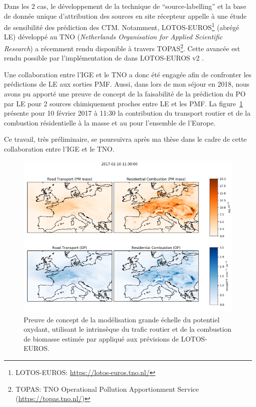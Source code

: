 Dans les 2 cas, le développement de la technique de ``source-labelling'' et la base de
donnée unique d'attribution des sources en site récepteur appelle à une étude de
sensibilité des prédiction des CTM. Notamment, LOTOS-EUROS\footnote{LOTOS-EUROS:
    \url{https://lotos-euros.tno.nl/}} (abrégé LE) développé au TNO (\textit{Netherlands Organisation for
Applied Scientific Research}) a récemment rendu disponible à travers TOPAS\footnote{TOPAS:
TNO Operational Pollution Apportionment Service (\url{https://topas.tno.nl/})}. Cette
avancée est rendu possible par l'implémentation de \cite{kranenburgSource2013} dans
LOTOS-EUROS v2 \autocite{mandersCurriculum2017}.

Une collaboration entre l'IGE et le TNO a donc été engagée afin de confronter les
prédictions de LE aux sorties PMF. Aussi, dans lors de mon séjour en 2018, nous
avons pu apporté une preuve de concept de la faisabilité de la prédiction du PO par
LE pour 2 sources chimiquement proches entre LE et les PMF.
La figure~\ref{fig:OPmap} présente pour 10 février 2017 à 11:30 la contribution du
transport routier et de la combustion résidentielle à la masse et au \PODTTv{} pour
l'ensemble de l'Europe.

Ce travail, très préliminaire, se poursuivra après ma thèse dans le cadre de cette
collaboration entre l'IGE et le TNO.

\begin{figure}[ht]
    \centering
    \includegraphics[width=0.8\linewidth]{figures/chapter05/OPmap.png}
    \caption{Preuve de concept de la modélisation grande échelle du potentiel oxydant,
    utilisant le \PODTT{} intrinsèque du trafic routier et de la combustion de biomasse
estimée par \cite{weberSourceinprep.} appliqué aux prévisions de LOTOS-EUROS.}%
    \label{fig:OPmap}
\end{figure}


